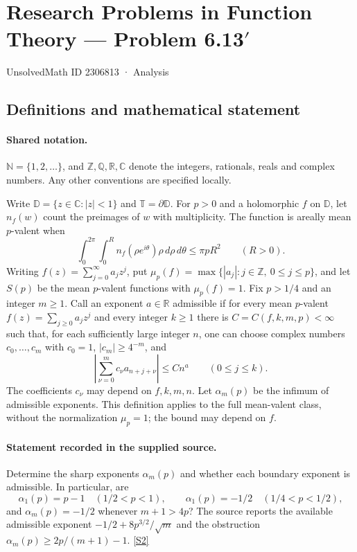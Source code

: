 \documentclass[11pt]{article}
\newcommand{\sref}[2]{\hyperlink{source:#1:#2}{[S#2]}}
\begin{document}
\setcounter{section}{2306812}
\section{Research Problems in Function Theory — Problem 6.13$\prime$}\label{2306813}
{\small\sffamily UnsolvedMath ID 2306813 · Analysis}
\subsection{Definitions and mathematical statement}

\paragraph{Shared notation.}$\mathbb N=\{1,2,\ldots\}$, and $\mathbb Z,\mathbb Q,\mathbb R,\mathbb C$ denote the integers, rationals, reals and complex numbers. Any other conventions are specified locally.


Write $\mathbb D=\{z\in\mathbb C:|z|<1\}$ and $\mathbb T=\partial\mathbb D$. For $p>0$ and a holomorphic $f$ on $\mathbb D$, let $n_f(w)$ count the preimages of $w$ with multiplicity. The function is areally mean $p$-valent when
\[\int_0^{2\pi}\int_0^R n_f(\rho e^{i\theta})\rho\,d\rho\,d\theta\leq\pi pR^2\qquad(R>0).\]
Writing $f(z)=\sum_{j=0}^{\infty}a_jz^j$, put $\mu_p(f)=\max\{|a_j|:j\in\mathbb Z,\ 0\leq j\leq p\}$, and let $S(p)$ be the mean $p$-valent functions with $\mu_p(f)=1$.
Fix $p>1/4$ and an integer $m\geq1$. Call an exponent $a\in\mathbb R$ admissible if for every mean $p$-valent $f(z)=\sum_{j\geq0}a_jz^j$ and every integer $k\geq1$ there is $C=C(f,k,m,p)<\infty$ such that, for each sufficiently large integer $n$, one can choose complex numbers $c_0,\ldots,c_m$ with $c_0=1$, $|c_m|\geq4^{-m}$, and
\[\left|\sum_{\nu=0}^{m}c_\nu a_{n+j+\nu}\right|\leq Cn^a\qquad(0\leq j\leq k).\]
The coefficients $c_\nu$ may depend on $f,k,m,n$. Let $\alpha_m(p)$ be the infimum of admissible exponents. This definition applies to the full mean-valent class, without the normalization $\mu_p=1$; the bound may depend on $f$.
\paragraph{Statement recorded in the supplied source.}
Determine the sharp exponents $\alpha_m(p)$ and whether each boundary exponent is admissible. In particular, are
\[\alpha_1(p)=p-1\quad(1/2<p<1),\qquad
\alpha_1(p)=-1/2\quad(1/4<p<1/2),\]
and $\alpha_m(p)=-1/2$ whenever $m+1>4p$? The source reports the available admissible exponent $-1/2+8p^{3/2}/\sqrt m$ and the obstruction $\alpha_m(p)\geq2p/(m+1)-1$. \sref{2306813}{2}
\end{document}
